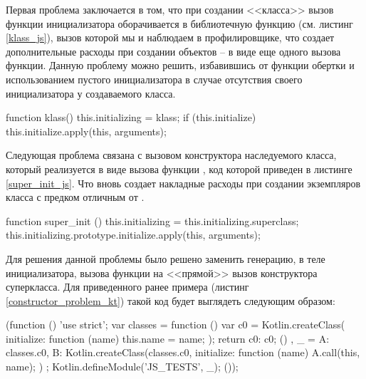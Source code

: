 Первая проблема заключается в том, что при создании <<класса>> вызов функции инициализатора  оборачивается в библиотечную функцию  (см. листинг \ref{klass_js}), вызов которой мы и наблюдаем в профилировщике, что создает дополнительные расходы при создании объектов -- в виде еще одного вызова функции. Данную проблему можно решить, избавившись от функции обертки и использованием пустого инициализатора в случае отсутствия своего инициализатора у создаваемого класса.

\begin{code}
\begin{JavaScript}[caption=Функция klass из стандартной библиотеки, label=klass_js]
function klass() {
    this.initializing = klass;
    if (this.initialize) {
        this.initialize.apply(this, arguments);
    }
}
\end{JavaScript}
\end{code}

Следующая проблема связана с вызовом конструктора наследуемого класса, который реализуется в виде вызова функции , код которой приведен в листинге \ref{super_init_js}. Что вновь создает накладные расходы при создании экземпляров класса с предком отличным от .

\begin{code}
\begin{JavaScript}[caption=Функция super\_init из стандартной библиотеки, label=super_init_js]
function super_init () {
	this.initializing = this.initializing.superclass;
	this.initializing.prototype.initialize.apply(this, arguments);
}                
\end{JavaScript}
\end{code}

Для решения данной проблемы было решено заменить генерацию, в теле инициализатора, вызова функции  на <<прямой>> вызов конструктора суперкласса. Для приведенного ранее примера (листинг \ref{constructor_problem_kt}) такой код будет выглядеть следующим образом:

\begin{code}
\begin{JavaScript}[caption=Результат компиляции примера с наследованием(листинг \ref{constructor_problem_kt}) с прямым вызовом конструктора суперкласса, label=constructor_problem_js_fixed]
(function () {
  'use strict';
  var classes = function () {
    var c0 = Kotlin.createClass({
      initialize: function (name) {
        this.name = name;
      }
    });
    return {c0: c0};
  }()
  , _ = {
    A: classes.c0,
    B: Kotlin.createClass(classes.c0, {
      initialize: function (name) {
        A.call(this, name);
      }
    })
  };
  Kotlin.defineModule('JS_TESTS', _);
}());
\end{JavaScript}
\end{code}


